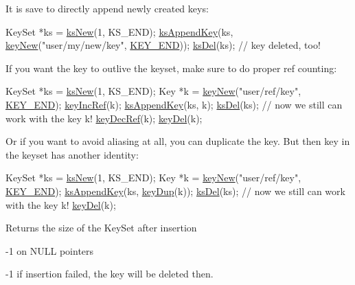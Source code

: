 It is save to directly append newly created keys\-: 
\begin{DoxyCodeInclude}
KeySet *ks = \hyperlink{group__keyset_ga671e1aaee3ae9dc13b4834a4ddbd2c3c}{ksNew}(1, KS\_END);
\hyperlink{group__keyset_gaa5a1d467a4d71041edce68ea7748ce45}{ksAppendKey}(ks,
        \hyperlink{group__key_gad23c65b44bf48d773759e1f9a4d43b89}{keyNew}(\textcolor{stringliteral}{"user/my/new/key"}, \hyperlink{group__key_gga91fb3178848bd682000958089abbaf40aa8adb6fcb92dec58fb19410eacfdd403}{KEY\_END}));
\hyperlink{group__keyset_ga27e5c16473b02a422238c8d970db7ac8}{ksDel}(ks);
\textcolor{comment}{// key deleted, too!}
\end{DoxyCodeInclude}
 If you want the key to outlive the keyset, make sure to do proper ref counting\-: 
\begin{DoxyCodeInclude}
KeySet *ks = \hyperlink{group__keyset_ga671e1aaee3ae9dc13b4834a4ddbd2c3c}{ksNew}(1, KS\_END);
Key *k = \hyperlink{group__key_gad23c65b44bf48d773759e1f9a4d43b89}{keyNew}(\textcolor{stringliteral}{"user/ref/key"}, \hyperlink{group__key_gga91fb3178848bd682000958089abbaf40aa8adb6fcb92dec58fb19410eacfdd403}{KEY\_END});
\hyperlink{group__key_ga6970a6f254d67af7e39f8e469bb162f1}{keyIncRef}(k);
\hyperlink{group__keyset_gaa5a1d467a4d71041edce68ea7748ce45}{ksAppendKey}(ks, k);
\hyperlink{group__keyset_ga27e5c16473b02a422238c8d970db7ac8}{ksDel}(ks);
\textcolor{comment}{// now we still can work with the key k!}
\hyperlink{group__key_ga2c6433ca22109e4e141946057eccb283}{keyDecRef}(k);
\hyperlink{group__key_ga3df95bbc2494e3e6703ece5639be5bb1}{keyDel}(k);
\end{DoxyCodeInclude}
 Or if you want to avoid aliasing at all, you can duplicate the key. But then key in the keyset has another identity\-: 
\begin{DoxyCodeInclude}
KeySet *ks = \hyperlink{group__keyset_ga671e1aaee3ae9dc13b4834a4ddbd2c3c}{ksNew}(1, KS\_END);
Key *k = \hyperlink{group__key_gad23c65b44bf48d773759e1f9a4d43b89}{keyNew}(\textcolor{stringliteral}{"user/ref/key"}, \hyperlink{group__key_gga91fb3178848bd682000958089abbaf40aa8adb6fcb92dec58fb19410eacfdd403}{KEY\_END});
\hyperlink{group__keyset_gaa5a1d467a4d71041edce68ea7748ce45}{ksAppendKey}(ks, \hyperlink{group__key_gae6ec6a60cc4b8c1463fa08623d056ce3}{keyDup}(k));
\hyperlink{group__keyset_ga27e5c16473b02a422238c8d970db7ac8}{ksDel}(ks);
\textcolor{comment}{// now we still can work with the key k!}
\hyperlink{group__key_ga3df95bbc2494e3e6703ece5639be5bb1}{keyDel}(k);
\end{DoxyCodeInclude}
 \begin{DoxyReturn}{Returns}
the size of the Key\-Set after insertion 

-\/1 on N\-U\-L\-L pointers 

-\/1 if insertion failed, the key will be deleted then. 
\end{DoxyReturn}

